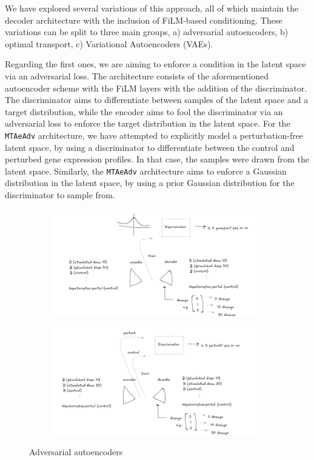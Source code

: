 \documentclass[12pt, a4paper]{article}
\begin{document}
We have explored several variations of this approach, all of which maintain the decoder architecture with the inclusion of FiLM-based conditioning. These variations can be split to three main groups, a) adversarial autoencoders, b) optimal transport, c) Variational Autoencoders (VAEs).

Regarding the first ones, we are aiming to enforce a condition in the latent space via an adversarial loss. The architecture consists of the aforementioned autoencoder scheme with the FiLM layers with the addition of the discriminator. The discriminator aims to differentiate between samples of the latent space and a target distribution, while the encoder aims to fool the discriminator via an adversarial loss to enforce the target distribution in the latent space. For the  \verb|MTAeAdv| architecture, we have attempted to explicitly model a perturbation-free latent space, by using a discriminator to differentiate between the control and perturbed gene expression profiles. In that case, the samples were drawn from the latent space. Similarly, the \verb|MTAeAdv| architecture aims to enforce a Gaussian distribution in the latent space, by using a prior Gaussian distribution for the discriminator to sample from. 

\begin{figure}
    \centering
    \begin{subfigure}[t]{0.48\textwidth}
        \centering
        \includegraphics[width=\textwidth]{ae_gauss_sketch.png}
        \caption{}
        \label{}
    \end{subfigure}
    \hfill
    \begin{subfigure}[t]{0.48\textwidth}
        \centering
        \includegraphics[width=\textwidth]{ae_adv_sketch.png}
        \caption{}
        \label{}
    \end{subfigure}
    \caption{Adversarial autoencoders}
    \label{}
\end{figure}
\end{document}
